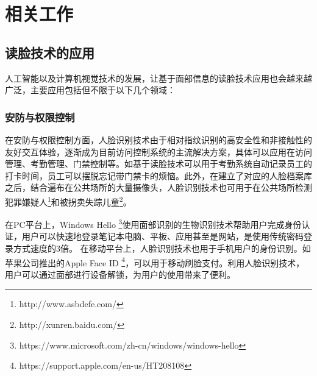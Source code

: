 \chapter{相关工作}

\section{读脸技术的应用}

人工智能以及计算机视觉技术的发展，让基于面部信息的读脸技术应用也会越来越广泛，主要应用包括但不限于以下几个领域：

\subsection{安防与权限控制}
在安防与权限控制方面，人脸识别技术由于相对指纹识别的高安全性和非接触性的友好交互体验，逐渐成为目前访问控制系统的主流解决方案，具体可以应用在访问管理、考勤管理、门禁控制等。如基于读脸技术可以用于考勤系统自动记录员工的打卡时间\cite{patel2014development}\cite{Owayjan2013Face}，员工可以摆脱忘记带门禁卡的烦恼。此外，在建立了对应的人脸档案库之后，结合遍布在公共场所的大量摄像头，人脸识别技术也可用于在公共场所检测犯罪嫌疑人\footnote{http://www.asbdefe.com/}和被拐卖失踪儿童\footnote{http://xunren.baidu.com/}。

在PC平台上，Windows Hello \footnote{https://www.microsoft.com/zh-cn/windows/windows-hello}使用面部识别的生物识别技术帮助用户完成身份认证，用户可以快速地登录笔记本电脑、平板、应用甚至是网站，是使用传统密码登录方式速度的3倍。
在移动平台上，人脸识别技术也用于手机用户的身份识别。如苹果公司推出的Apple Face ID \footnote{https://support.apple.com/en-us/HT208108}，可以用于移动刷脸支付。利用人脸识别技术，用户可以通过面部进行设备解锁，为用户的使用带来了便利。

